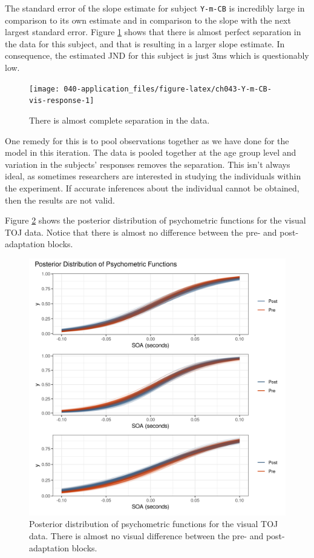 \documentclass[11pt, oneside, openany]{scrbook}
\begin{document}
The standard error of the slope estimate for subject \texttt{Y-m-CB} is incredibly large in comparison to its own estimate and in comparison to the slope with the next largest standard error. Figure \ref{fig:ch043-Y-m-CB-vis-response} shows that there is almost perfect separation in the data for this subject, and that is resulting in a larger slope estimate. In consequence, the estimated JND for this subject is just 3ms which is questionably low.

\begin{figure}

{\centering \texttt{[image: 040-application\_files/figure-latex/ch043-Y-m-CB-vis-response-1]} 

}

\caption{There is almost complete separation in the data.}\label{fig:ch043-Y-m-CB-vis-response}
\end{figure}

One remedy for this is to pool observations together as we have done for the model in this iteration. The data is pooled together at the age group level and variation in the subjects' responses removes the separation. This isn't always ideal, as sometimes researchers are interested in studying the individuals within the experiment. If accurate inferences about the individual cannot be obtained, then the results are not valid.

Figure \ref{fig:ch043-Iron-Intensive} shows the posterior distribution of psychometric functions for the visual TOJ data. Notice that there is almost no difference between the pre- and post-adaptation blocks.

\begin{figure}

{\centering \includegraphics[width=0.85\linewidth]{figures/ch043-Iron-Intensive} 

}

\caption{Posterior distribution of psychometric functions for the visual TOJ data. There is almost no visual difference between the pre- and post-adaptation blocks.}\label{fig:ch043-Iron-Intensive}
\end{figure}
\end{document}
